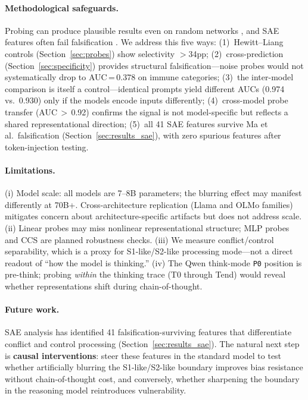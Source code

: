 \documentclass[twocolumn,10pt]{article}
\newcommand{\sone}{S1-like}
\newcommand{\stwo}{S2-like}
\newcommand{\pzero}{\texttt{P0}}
\begin{document}
\paragraph{Methodological safeguards.}
Probing can produce plausible results even on random networks
\citep{meloux2025dead}, and SAE features often fail falsification
\citep{sanitychecks2026}.  We address this five ways: (1)~Hewitt--Liang
controls (Section~\ref{sec:probes}) show selectivity $>$34pp;
(2)~cross-prediction (Section~\ref{sec:specificity}) provides structural
falsification---noise probes would not systematically drop to
AUC\,=\,0.378 on immune categories; (3)~the inter-model comparison is
itself a control---identical prompts yield different AUCs (0.974
vs.\ 0.930) only if the models encode inputs differently;
(4)~cross-model probe transfer (AUC\,$>$\,0.92) confirms the signal is
not model-specific but reflects a shared representational direction;
(5)~all 41 SAE features survive Ma et al.\ falsification
(Section~\ref{sec:results_sae}), with zero spurious features after
token-injection testing.

\paragraph{Limitations.}
(i) Model scale: all models are 7--8B parameters; the blurring effect
may manifest differently at 70B+.  Cross-architecture replication
(Llama and OLMo families) mitigates concern about architecture-specific
artifacts but does not address scale.
(ii) Linear probes may miss nonlinear representational structure; MLP
probes and CCS \citep{burns2022discovering} are planned robustness checks.
(iii) We measure conflict/control separability, which is a proxy for
\sone{}/\stwo{} processing mode---not a direct readout of ``how the model
is thinking.''
(iv) The Qwen think-mode \pzero{} position is pre-think; probing
\emph{within} the thinking trace (T0 through Tend) would reveal whether
representations shift during chain-of-thought.

\paragraph{Future work.}
SAE analysis has identified 41 falsification-surviving features that
differentiate conflict and control processing
(Section~\ref{sec:results_sae}).  The natural next step is
\textbf{causal interventions}: steer these features in the standard
model to test whether artificially blurring the \sone{}/\stwo{}
boundary improves bias resistance without chain-of-thought cost, and
conversely, whether sharpening the boundary in the reasoning model
reintroduces vulnerability.
\end{document}
